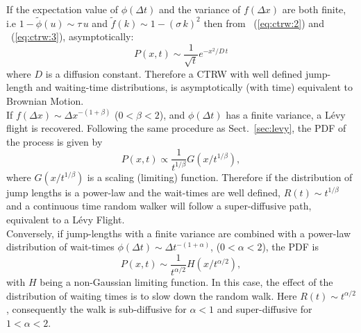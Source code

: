  If the expectation value of $\phi(\Delta t)$ and the variance of $f(\Delta x)$ are both finite, i.e $1 - \tilde{\phi}(u) \sim \tau \, u$ and $\tilde{f}(k) \sim 1 - (\sigma \, k)^2$ then from \equationname~(\ref{eq:ctrw:2}) and \equationname~(\ref{eq:ctrw:3}), asymptotically:
\begin{equation}
P(x,t) \sim \frac{1}{\sqrt{t}}e^{-x^2/D\, t}
\end{equation}
where $D$ is a diffusion constant. Therefore a CTRW with well defined jump-length and waiting-time distributions, is asymptotically (with time) equivalent to Brownian Motion.\\ 

 If $f(\Delta x) \sim \Delta x^{-(1+\beta)}$ ($0<\beta<2$), and $\phi(\Delta t)$ has a finite variance, a L\'evy flight is recovered. Following the same procedure as Sect.~\ref{sec:levy}, the PDF of the process is given by
\begin{equation}
P(x,t) \propto \frac{1}{t^{1/\beta}}G(x/t^{1/\beta}) ,
\end{equation}
where $G(x/t^{1/\beta})$ is a scaling (limiting) function. Therefore if the distribution of jump lengths is a power-law and the wait-times are well defined, $R(t) \sim t^{1/\beta}$ and a continuous time random walker will follow a super-diffusive path, equivalent to a L\'evy Flight.\\

 Conversely, if jump-lengths with a finite variance are combined with a power-law distribution of wait-times
$\phi(\Delta t) \sim \Delta t^{-(1+ \alpha)}$, ($0 < \alpha < 2$), the PDF is
\begin{equation}
P(x,t) \sim \frac{1}{t^{\alpha/2}}H(x/t^{\alpha/2}) ,
\end{equation}
with $H$ being a non-Gaussian limiting function. In this case, the effect of the distribution of waiting times is to slow down the random walk. Here $R(t) \sim t^{\alpha/2}$, consequently the walk is sub-diffusive for $\alpha <1 $ and super-diffusive for $1 < \alpha <2$.\\

